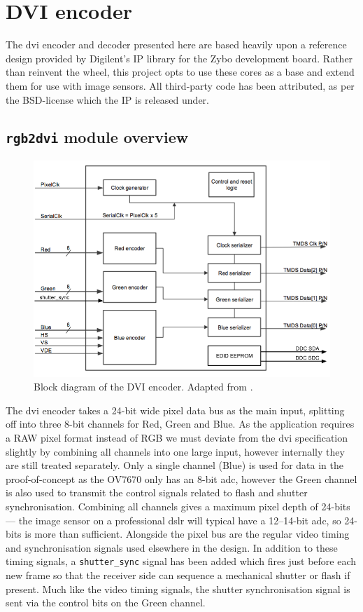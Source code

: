\section{DVI encoder}

The \gls{dvi} encoder and decoder presented here are based heavily upon a reference design provided by Digilent's IP library for the Zybo development board. Rather than reinvent the wheel, this project opts to use these cores as a base and extend them for use with image sensors. All third-party code has been attributed, as per the BSD-license which the IP is released under.

\subsection{\texttt{rgb2dvi} module overview}
\begin{figure}
  \centering
  \includegraphics[width=1\textwidth]{./img/rgb2dvi.png}
  \caption{Block diagram of the DVI encoder. Adapted from \cite{rgb2dvi}.}
  \label{fig:rgb2dvi}
\end{figure}

The \gls{dvi} encoder takes a 24-bit wide pixel data bus as the main input, splitting off into three 8-bit channels for Red, Green and Blue. As the application requires a RAW pixel format instead of RGB we must deviate from the \gls{dvi} specification slightly by combining all channels into one large input, however internally they are still treated separately. Only a single channel (Blue) is used for data in the proof-of-concept as the OV7670 only has an 8-bit \gls{adc}, however the Green channel is also used to transmit the control signals related to flash and shutter synchronisation. Combining all channels gives a maximum pixel depth of 24-bits --- the image sensor on a professional \gls{dslr} will typical have a 12--14-bit \gls{adc}, so 24-bits is more than sufficient. Alongside the pixel bus are the regular video timing and synchronisation signals used elsewhere in the design. In addition to these timing signals, a \texttt{shutter\_sync} signal has been added which fires just before each new frame so that the receiver side can sequence a mechanical shutter or flash if present. Much like the video timing signals, the shutter synchronisation signal is sent via the control bits on the Green channel.

